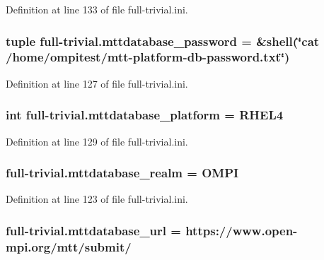 Definition at line 133 of file full-\/trivial.\-ini.

\hypertarget{namespacefull-trivial_a00ca0a7632b4a85ca5df552bc984a77d}{
\subsubsection[{mttdatabase\-\_\-password}]{\setlength{\rightskip}{0pt plus 5cm}tuple full-\/trivial.\-mttdatabase\-\_\-password = \&shell(\char`\"{}cat /home/ompitest/mtt-\/platform-\/db-\/password.\-txt\char`\"{})}}\label{namespacefull-trivial_a00ca0a7632b4a85ca5df552bc984a77d}


Definition at line 127 of file full-\/trivial.\-ini.

\hypertarget{namespacefull-trivial_a7435f3a6cf574a375aa8cb9b7b2fe162}{
\subsubsection[{mttdatabase\-\_\-platform}]{\setlength{\rightskip}{0pt plus 5cm}int full-\/trivial.\-mttdatabase\-\_\-platform = R\-H\-E\-L4}}\label{namespacefull-trivial_a7435f3a6cf574a375aa8cb9b7b2fe162}


Definition at line 129 of file full-\/trivial.\-ini.

\hypertarget{namespacefull-trivial_a5f93117c210f5de7bd0b75c05ca93072}{
\subsubsection[{mttdatabase\-\_\-realm}]{\setlength{\rightskip}{0pt plus 5cm}full-\/trivial.\-mttdatabase\-\_\-realm = O\-M\-P\-I}}\label{namespacefull-trivial_a5f93117c210f5de7bd0b75c05ca93072}


Definition at line 123 of file full-\/trivial.\-ini.

\hypertarget{namespacefull-trivial_a1e6b981d941fc6b728d6faae8632e225}{
\subsubsection[{mttdatabase\-\_\-url}]{\setlength{\rightskip}{0pt plus 5cm}full-\/trivial.\-mttdatabase\-\_\-url = https\-://www.\-open-\/mpi.\-org/mtt/submit/}}\label{namespacefull-trivial_a1e6b981d941fc6b728d6faae8632e225}


